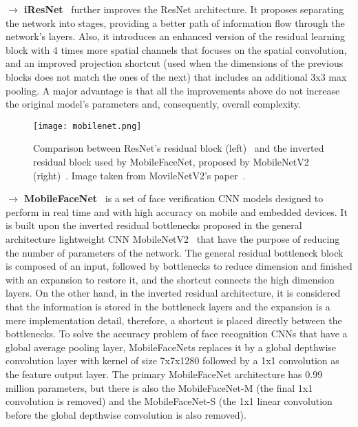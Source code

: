 \documentclass[class=report, crop=false, a4paper, 12pt]{standalone}
\begin{document}
\vspace{0.7\baselineskip}
\noindent\textbf{$\rightarrow$ iResNet}~\autocite{dutaImprovedResidualNetworks2021} further improves the ResNet architecture. It proposes separating the network into stages, providing a better path of information flow through the network's layers. Also, it introduces an enhanced version of the residual learning block with 4 times more spatial channels that focuses on the spatial convolution, and an improved projection shortcut (used when the dimensions of the previous blocks does not match the ones of the next) that includes an additional 3x3 max pooling. A major advantage is that all the improvements above do not increase the original model's parameters and, consequently, overall complexity.

\vspace{0.7\baselineskip}
\begin{figure}[H]
    \centering
    \texttt{[image: mobilenet.png]}
    \caption[Comparison between ResNet's residual block and the inverted residual block proposed by MobileNetV2.]{Comparison between ResNet's residual block (left)~\autocite{chenMobileFaceNetsEfficientCNNs2018} and the inverted residual block used by MobileFaceNet, proposed by MobileNetV2 (right)~\autocite{sandlerMobileNetV2InvertedResiduals2019}. Image taken from MovileNetV2's paper~\autocite{sandlerMobileNetV2InvertedResiduals2019}.}
    \label{fig:mobilefacenet}
\end{figure}

\label{mobilefacenet}
\noindent\textbf{$\rightarrow$ MobileFaceNet}~\autocite{chenMobileFaceNetsEfficientCNNs2018} is a set of face verification CNN models designed to perform in real time and with high accuracy on mobile and embedded devices. It is built upon the inverted residual bottlenecks  proposed in the general architecture lightweight CNN MobileNetV2~\autocite{sandlerMobileNetV2InvertedResiduals2019} that have the purpose of reducing the number of parameters of the network. The general residual bottleneck block~\autocite{heDeepResidualLearning2016} is composed of an input, followed by bottlenecks to reduce dimension and finished with an expansion to restore it, and the shortcut connects the high dimension layers. On the other hand, in the inverted residual architecture, it is considered that the information is stored in the bottleneck layers and the expansion is a mere implementation detail, therefore, a shortcut is placed directly between the bottlenecks. To solve the accuracy problem of face recognition CNNs that have a global average pooling layer, MobileFaceNets replaces it by a global depthwise convolution layer with kernel of size 7x7x1280 followed by a 1x1 convolution as the feature output layer. The primary MobileFaceNet architecture has 0.99 million parameters, but there is also the MobileFaceNet-M (the final 1x1 convolution is removed) and the MobileFaceNet-S (the 1x1 linear convolution before the global depthwise convolution is also removed).
\end{document}
